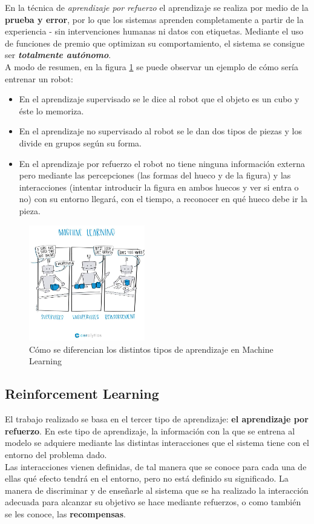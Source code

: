En la técnica de \textit{aprendizaje por refuerzo} el aprendizaje se realiza por medio de la \textbf{\textbf{prueba y error}}, por lo que los sistemas aprenden completamente a partir de la experiencia - sin intervenciones humanas ni datos con etiquetas. Mediante el uso de funciones de premio que optimizan su comportamiento, el sistema se consigue ser \textbf{\textit{totalmente autónomo}}. \\

A modo de resumen, en la figura \ref{fig:ml_ceralytics} se puede observar un ejemplo de cómo sería entrenar un robot:

\begin{itemize}
    \item En el aprendizaje supervisado se le dice al robot que el objeto es un cubo y éste lo memoriza.
    \item En el aprendizaje no supervisado al robot se le dan dos tipos de piezas y los divide en grupos según su forma.
    \item En el aprendizaje por refuerzo el robot no tiene ninguna información externa pero mediante las percepciones (las formas del hueco y de la figura) y las interacciones (intentar introducir la figura en ambos huecos y ver si entra o no) con su entorno llegará, con el tiempo, a reconocer en qué hueco debe ir la pieza.
\end{itemize}
\begin{figure}[h]
    \centering
    \includegraphics[width=0.45\textwidth]{cap2_contextualizacion/images/machine-learning_ceralytics.jpg}
    \caption{Cómo se diferencian los distintos tipos de aprendizaje en Machine Learning \cite{ceralyticsMLtypes}}
    \label{fig:ml_ceralytics}
\end{figure}
\subsection{Reinforcement Learning}

El trabajo realizado se basa en el tercer tipo de aprendizaje: \textbf{el aprendizaje por refuerzo}. En este tipo de aprendizaje, la información con la que se entrena al modelo se adquiere mediante las distintas interacciones que el sistema tiene con el entorno del problema dado. \\

Las interacciones vienen definidas, de tal manera que se conoce para cada una de ellas qué efecto tendrá en el entorno, pero no está definido su significado. La manera de discriminar y de enseñarle al sistema que se ha realizado la interacción adecuada para alcanzar su objetivo se hace mediante refuerzos, o como también se les conoce, las \textbf{recompensas}. 